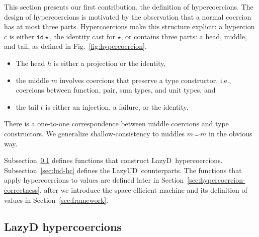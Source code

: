 \documentclass[acmsmall,review,anonymous]{acmart}\settopmatter{printfolios=true,printccs=false,printacmref=false}
\newcommand{\figref}[1]{Fig.~\ref{#1}}
\newcommand{\lazyUD}{Lazy\;UD}
\newcommand{\lazyD}{Lazy\;D}
\newcommand{\TOOdyn}[0]{\star}
\newcommand{\hyperCoercionI}[0]{\mathtt{id\star}}
\begin{document}
This section presents our first contribution, the definition of
hypercoercions.  The design of hypercoercions is motivated by the
observation that a normal coercion has at most three
parts. Hypercoercions make this structure explicit: a hypercion $c$ is
either $\hyperCoercionI$, the identity cast for $\TOOdyn$, or contains
three parts: a head, middle, and tail, as defined in
\figref{fig:hypercoercion}.
\begin{itemize}
\item The head $h$ is either a projection or the identity,
\item the middle $m$ involves coercions that preserve a type
  constructor, i.e., coercions between function, pair, sum types, and
  unit types, and
\item the tail $t$ is either an injection, a failure, or the identity.
\end{itemize}
There is a one-to-one correspondence between middle coercions and type
constructors.  We generalize shallow-consistency to middles $m \smile
m$ in the obvious way.

Subsection~\ref{sec:ld-hc} defines functions that construct
\lazyD\ hypercoercions. Subsection~\ref{sec:lud-hc} defines the
\lazyUD\ counterparts.  The functions that apply hypercoercions to
values are defined later in
Section~\ref{sec:hypercoercion-correctness}, after we introduce the
space-efficient machine and its definition of values in
Section~\ref{sec:framework}.

\subsection{\lazyD{} hypercoercions}
\label{sec:ld-hc}
\end{document}
